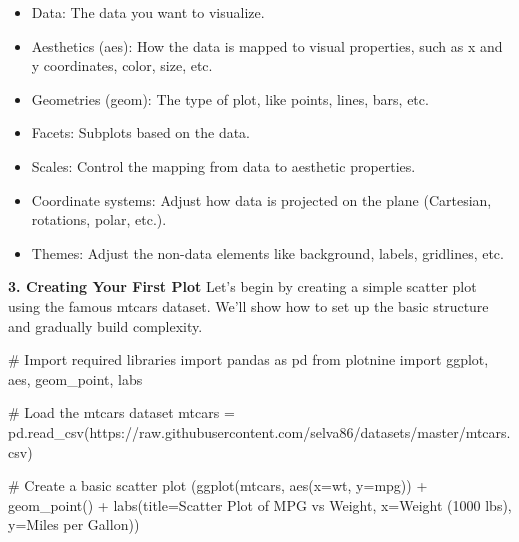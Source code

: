 \documentclass[
  letterpaper,
  DIV=11,
  numbers=noendperiod]{scrreprt}
\newenvironment{Shaded}{\begin{snugshade}}{\end{snugshade}}
\newcommand{\CommentTok}[1]{\textcolor[rgb]{0.37,0.37,0.37}{#1}}
\newcommand{\ImportTok}[1]{\textcolor[rgb]{0.00,0.46,0.62}{#1}}
\newcommand{\NormalTok}[1]{\textcolor[rgb]{0.00,0.23,0.31}{#1}}
\newcommand{\OperatorTok}[1]{\textcolor[rgb]{0.37,0.37,0.37}{#1}}
\newcommand{\StringTok}[1]{\textcolor[rgb]{0.13,0.47,0.30}{#1}}
\providecommand{\tightlist}{%
  \setlength{\itemsep}{0pt}\setlength{\parskip}{0pt}}\usepackage{longtable,booktabs,array}
\begin{document}
\begin{itemize}
\tightlist
\item
  Data: The data you want to visualize.
\item
  Aesthetics (aes): How the data is mapped to visual properties, such as
  x and y coordinates, color, size, etc.
\item
  Geometries (geom): The type of plot, like points, lines, bars, etc.
\item
  Facets: Subplots based on the data.
\item
  Scales: Control the mapping from data to aesthetic properties.
\item
  Coordinate systems: Adjust how data is projected on the plane
  (Cartesian, rotations, polar, etc.).
\item
  Themes: Adjust the non-data elements like background, labels,
  gridlines, etc.
\end{itemize}

\textbf{3. Creating Your First Plot} Let's begin by creating a simple
scatter plot using the famous mtcars dataset. We'll show how to set up
the basic structure and gradually build complexity.

\begin{Shaded}
\begin{Highlighting}[]
\CommentTok{\# Import required libraries}
\ImportTok{import}\NormalTok{ pandas }\ImportTok{as}\NormalTok{ pd}
\ImportTok{from}\NormalTok{ plotnine }\ImportTok{import}\NormalTok{ ggplot, aes, geom\_point, labs}

\CommentTok{\# Load the mtcars dataset}
\NormalTok{mtcars }\OperatorTok{=}\NormalTok{ pd.read\_csv(}\StringTok{\textquotesingle{}https://raw.githubusercontent.com/selva86/datasets/master/mtcars.csv\textquotesingle{}}\NormalTok{)}

\CommentTok{\# Create a basic scatter plot}
\NormalTok{(ggplot(mtcars, aes(x}\OperatorTok{=}\StringTok{\textquotesingle{}wt\textquotesingle{}}\NormalTok{, y}\OperatorTok{=}\StringTok{\textquotesingle{}mpg\textquotesingle{}}\NormalTok{)) }\OperatorTok{+}
\NormalTok{ geom\_point() }\OperatorTok{+}
\NormalTok{ labs(title}\OperatorTok{=}\StringTok{\textquotesingle{}Scatter Plot of MPG vs Weight\textquotesingle{}}\NormalTok{,}
\NormalTok{      x}\OperatorTok{=}\StringTok{\textquotesingle{}Weight (1000 lbs)\textquotesingle{}}\NormalTok{,}
\NormalTok{      y}\OperatorTok{=}\StringTok{\textquotesingle{}Miles per Gallon\textquotesingle{}}\NormalTok{))}
\end{Highlighting}
\end{Shaded}
\end{document}
